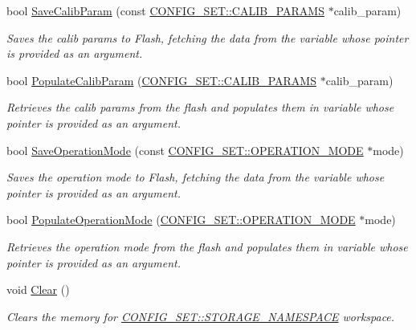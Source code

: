 \begin{DoxyCompactItemize}
bool \hyperlink{classStorage_a93011e30e7b8371f711f73f40c585026}{Save\+Calib\+Param} (const \hyperlink{structCONFIG__SET_1_1CALIB__PARAMS}{C\+O\+N\+F\+I\+G\+\_\+\+S\+E\+T\+::\+C\+A\+L\+I\+B\+\_\+\+P\+A\+R\+A\+MS} $\ast$calib\+\_\+param)
\begin{DoxyCompactList}\small\item\em Saves the calib params to Flash, fetching the data from the variable whose pointer is provided as an argument. \end{DoxyCompactList}\item 
bool \hyperlink{classStorage_a92d3e34f9365b3a2b5e84ba5be442038}{Populate\+Calib\+Param} (\hyperlink{structCONFIG__SET_1_1CALIB__PARAMS}{C\+O\+N\+F\+I\+G\+\_\+\+S\+E\+T\+::\+C\+A\+L\+I\+B\+\_\+\+P\+A\+R\+A\+MS} $\ast$calib\+\_\+param)
\begin{DoxyCompactList}\small\item\em Retrieves the calib params from the flash and populates them in variable whose pointer is provided as an argument. \end{DoxyCompactList}\item 
bool \hyperlink{classStorage_ab7c03d2d026178e06e72507f643fcf4a}{Save\+Operation\+Mode} (const \hyperlink{namespaceCONFIG__SET_ac5c2592b79bead7e6497c37cddc401e6}{C\+O\+N\+F\+I\+G\+\_\+\+S\+E\+T\+::\+O\+P\+E\+R\+A\+T\+I\+O\+N\+\_\+\+M\+O\+DE} $\ast$mode)
\begin{DoxyCompactList}\small\item\em Saves the operation mode to Flash, fetching the data from the variable whose pointer is provided as an argument. \end{DoxyCompactList}\item 
bool \hyperlink{classStorage_adc744139f574c6b1f28c7e29756b0591}{Populate\+Operation\+Mode} (\hyperlink{namespaceCONFIG__SET_ac5c2592b79bead7e6497c37cddc401e6}{C\+O\+N\+F\+I\+G\+\_\+\+S\+E\+T\+::\+O\+P\+E\+R\+A\+T\+I\+O\+N\+\_\+\+M\+O\+DE} $\ast$mode)
\begin{DoxyCompactList}\small\item\em Retrieves the operation mode from the flash and populates them in variable whose pointer is provided as an argument. \end{DoxyCompactList}\item 
void \hyperlink{classStorage_acffef9e721035589505c170f2f612b07}{Clear} ()
\begin{DoxyCompactList}\small\item\em Clears the memory for \hyperlink{namespaceCONFIG__SET_adc424e5a5b81f2016a88456fd2f383d9}{C\+O\+N\+F\+I\+G\+\_\+\+S\+E\+T\+::\+S\+T\+O\+R\+A\+G\+E\+\_\+\+N\+A\+M\+E\+S\+P\+A\+CE} workspace. \end{DoxyCompactList}\end{DoxyCompactItemize}
